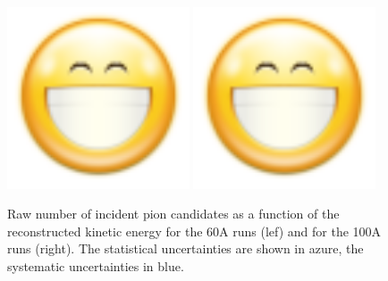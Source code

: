 \begin{figure}
\centering  
\includegraphics[width=0.48\textwidth]{Chapter-4/Images/face-smile-big.png}
\includegraphics[width=0.48\textwidth]{Chapter-4/Images/face-smile-big.png}
\caption{Raw number of incident pion candidates as a function of the reconstructed kinetic energy for the 60A runs (lef) and for the 100A runs (right). The statistical uncertainties are shown in azure, the systematic uncertainties in blue.}
\label{fig:IncidentRaw}
\end{figure}

